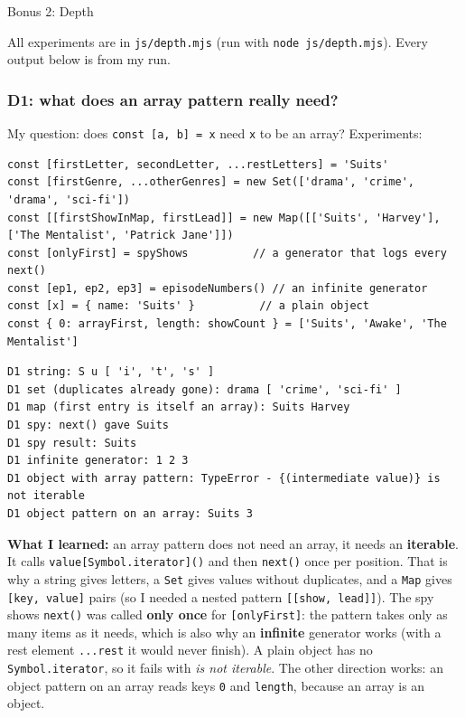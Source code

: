 \documentclass[
  10pt,
]{article}
\newcommand{\passthrough}[1]{#1}
\begin{document}
Bonus 2: Depth

All experiments are in \passthrough{\lstinline!js/depth.mjs!} (run with
\passthrough{\lstinline!node js/depth.mjs!}). Every output below is from
my run.

\hypertarget{d1-what-does-an-array-pattern-really-need}{%
\subsubsection{D1: what does an array pattern really
need?}\label{d1-what-does-an-array-pattern-really-need}}

My question: does \passthrough{\lstinline!const [a, b] = x!} need
\passthrough{\lstinline!x!} to be an array? Experiments:

\begin{lstlisting}
const [firstLetter, secondLetter, ...restLetters] = 'Suits'
const [firstGenre, ...otherGenres] = new Set(['drama', 'crime', 'drama', 'sci-fi'])
const [[firstShowInMap, firstLead]] = new Map([['Suits', 'Harvey'], ['The Mentalist', 'Patrick Jane']])
const [onlyFirst] = spyShows          // a generator that logs every next()
const [ep1, ep2, ep3] = episodeNumbers() // an infinite generator
const [x] = { name: 'Suits' }          // a plain object
const { 0: arrayFirst, length: showCount } = ['Suits', 'Awake', 'The Mentalist']
\end{lstlisting}

\begin{lstlisting}
D1 string: S u [ 'i', 't', 's' ]
D1 set (duplicates already gone): drama [ 'crime', 'sci-fi' ]
D1 map (first entry is itself an array): Suits Harvey
D1 spy: next() gave Suits
D1 spy result: Suits
D1 infinite generator: 1 2 3
D1 object with array pattern: TypeError - {(intermediate value)} is not iterable
D1 object pattern on an array: Suits 3
\end{lstlisting}

\textbf{What I learned:} an array pattern does not need an array, it
needs an \textbf{iterable}. It calls
\passthrough{\lstinline!value[Symbol.iterator]()!} and then
\passthrough{\lstinline!next()!} once per position. That is why a string
gives letters, a \passthrough{\lstinline!Set!} gives values without
duplicates, and a \passthrough{\lstinline!Map!} gives
\passthrough{\lstinline![key, value]!} pairs (so I needed a nested
pattern \passthrough{\lstinline![[show, lead]]!}). The spy shows
\passthrough{\lstinline!next()!} was called \textbf{only once} for
\passthrough{\lstinline![onlyFirst]!}: the pattern takes only as many
items as it needs, which is also why an \textbf{infinite} generator
works (with a rest element \passthrough{\lstinline!...rest!} it would
never finish). A plain object has no
\passthrough{\lstinline!Symbol.iterator!}, so it fails with \emph{is not
iterable}. The other direction works: an object pattern on an array
reads keys \passthrough{\lstinline!0!} and
\passthrough{\lstinline!length!}, because an array is an object.
\end{document}
